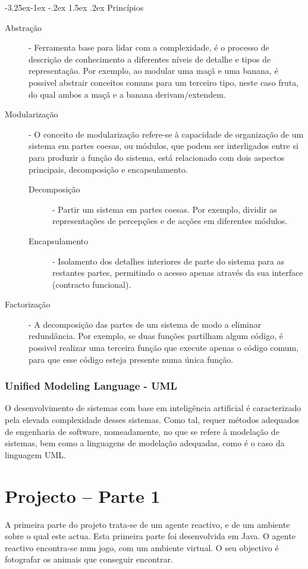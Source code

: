 \documentclass[a4paper,12pt]{article}
\makeatletter
\renewcommand\paragraph{\@startsection{paragraph}{4}{\z@}%
                {-3.25ex\@plus -1ex \@minus -.2ex}%
                {1.5ex \@plus .2ex}%
                {\normalfont\normalsize\bfseries}}
\makeatother
\begin{document}
\paragraph{Princípios} \label{principios}
\begin{description}
	\item[Abstração] - Ferramenta base para lidar com a complexidade, é o processo de descrição de conhecimento a diferentes níveis de detalhe e tipos de representação. Por exemplo, ao modular uma maçã e uma banana, é possivel abstrair conceitos comuns para um terceiro tipo, neste caso fruta, do qual ambos a maçã e a banana derivam/extendem.
	\item[Modularização] - O conceito de modularização refere-se à capacidade de organização de um sistema em partes coesas, ou módulos, que podem ser interligados entre si para produzir a função do sistema, está relacionado com dois aspectos principais, decomposição e encapsulamento.
		\begin{description}
			\item[Decomposição] - Partir um sistema em partes coesas. Por exemplo, dividir as representações de percepções e de acções em diferentes módulos.
			\item[Encapsulamento] - Isolamento dos detalhes interiores de parte do sistema para as restantes partes, permitindo o acesso apenas através da sua interface (contracto funcional).
		\end{description}
	\item[Factorização] - A decomposição das partes de um sistema de modo a eliminar redundância. Por exemplo, se duas funções partilham algum código, é possivel realizar uma terceira função que execute apenas o código comum, para que esse código esteja presente numa única função.
\end{description}

\subsubsection{Unified Modeling Language - UML} \label{unified_modeling_language_uml}
O desenvolvimento de sistemas com base em inteligência artificial é caracterizado pela elevada complexidade desses sistemas. Como tal, requer métodos adequados de engenharia de software, nomeadamente, no que se
refere à modelação de sistemas, bem como a linguagens de modelação adequadas, como é o caso da linguagem UML.
	
\newpage
\section{Projecto – Parte 1}
A primeira parte do projeto trata-se de um agente reactivo, e de um ambiente sobre o qual este actua. Esta primeira parte foi desenvolvida em Java.
O agente reactivo encontra-se num jogo, com um ambiente virtual. O seu objectivo é fotografar os animais que conseguir encontrar.
\end{document}
